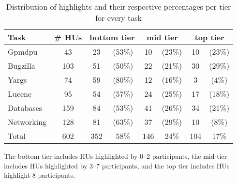 \begin{table}
\caption{Distribution of highlights and their respective percentages per tier for every task}
\begin{footnotesize}
\begin{threeparttable} 
\begin{tabular}{l|c|cc|cc|cc}
\hline    
\textbf{Task}  
& \textbf{\# HUs} 
& \multicolumn{2}{c|}{\textbf{bottom tier}\tnote{\dag}} 
& \multicolumn{2}{c|}{\textbf{mid tier}\tnote{\dag}} 
& \multicolumn{2}{c}{\textbf{top tier}\tnote{\dag}}\\
\hline    
\hline

Gpmdpu & 43 & 23 & (53\%) & 10 & (23\%) & 10 & (23\%) \\     
Bugzilla & 103 & 51 & (50\%) & 22 & (21\%) & 30 & (29\%) \\
Yargs & 74 & 59 & (80\%) & 12 & (16\%) & 3 & (4\%) \\
Lucene & 95 & 54 & (57\%) & 24 & (25\%) & 17 & (18\%) \\
Databases & 159 & 84 & (53\%) & 41 & (26\%) & 34 & (21\%) \\
Networking & 128 & 81 & (63\%) & 37 & (29\%) & 10 & (8\%) \\
\hline    
\hline 
\rowcolor{white}
Total & 602 & 352 & 58\% & 146 & 24\% & 104 & 17\% \\

\hline 
\end{tabular}
\begin{tablenotes}
    \item[\dag] \scriptsize The bottom tier includes HUs highlighted by 0--2 participants, the mid tier includes HUs highlighted by 3--7 participants, and the top tier includes HUs highlight  8 participants.    
\end{tablenotes}   
\end{threeparttable} 
\end{footnotesize}
\label{tbl:task-hu}
\end{table}
    